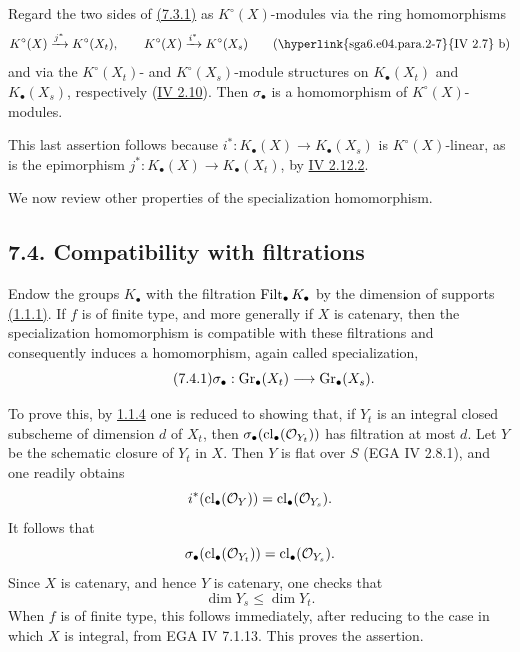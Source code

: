 Regard the two sides of \hyperlink{sga6.e10.eq.7-3-1}{(7.3.1)} as $K^\circ(X)$-modules via the ring
homomorphisms
\[
K^\circ(X)\xrightarrow{j^*}K^\circ(X_t),
\qquad
K^\circ(X)\xrightarrow{i^*}K^\circ(X_s)
\qquad\text{(\hyperlink{sga6.e04.para.2-7}{IV 2.7} b)}
\]
and via the $K^\circ(X_t)$- and $K^\circ(X_s)$-module structures on
$K_\bullet(X_t)$ and $K_\bullet(X_s)$, respectively (\hyperlink{sga6.e04.para.2-10}{IV 2.10}). Then
$\sigma_\bullet$ is a homomorphism of $K^\circ(X)$-modules.

This last assertion follows because
$i^*:K_\bullet(X)\to K_\bullet(X_s)$ is $K^\circ(X)$-linear, as is the
epimorphism $j^*:K_\bullet(X)\to K_\bullet(X_t)$, by \hyperlink{sga6.e04.eq.2-12-2}{IV 2.12.2}.

We now review other properties of the specialization homomorphism.

\subsection*{7.4. Compatibility with filtrations}
Endow the groups $K_\bullet$ with the filtration $\operatorname{Filt}_\bullet K_\bullet$
by the dimension of supports \hyperlink{sga6.e10.def.1-1-1}{(1.1.1)}. If $f$ is of finite type, and more
generally if $X$ is catenary, then the specialization homomorphism is
compatible with these filtrations and consequently induces a homomorphism,
again called specialization,
\begin{equation}\tag{7.4.1}
\sigma_\bullet:\operatorname{Gr}_\bullet(X_t)\longrightarrow\operatorname{Gr}_\bullet(X_s).
\end{equation}

To prove this, by \hyperlink{sga6.e10.cor.1-1-4}{1.1.4} one is reduced to showing that, if $Y_t$ is an
integral closed subscheme of dimension $d$ of $X_t$, then
$\sigma_\bullet(\operatorname{cl}_\bullet(\mathcal O_{Y_t}))$ has filtration at most
$d$. Let $Y$ be the schematic closure of $Y_t$ in $X$. Then $Y$ is flat
over $S$ (EGA IV 2.8.1), and one readily obtains
\[
i^*(\operatorname{cl}_\bullet(\mathcal O_Y))
=\operatorname{cl}_\bullet(\mathcal O_{Y_s}).
\]
It follows that
\[
\sigma_\bullet(\operatorname{cl}_\bullet(\mathcal O_{Y_t}))
=\operatorname{cl}_\bullet(\mathcal O_{Y_s}).
\]
Since $X$ is catenary, and hence $Y$ is catenary, one checks that
\[
\dim Y_s\leq\dim Y_t.
\]
When $f$ is of finite type, this follows immediately, after reducing to the
case in which $X$ is integral, from EGA IV 7.1.13. This proves the assertion.

